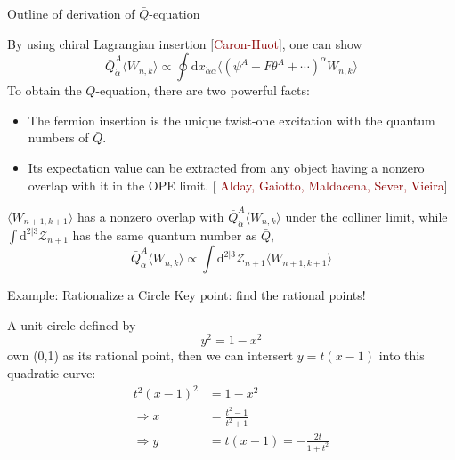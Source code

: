 \documentclass[10pt]{beamer}
\newcommand{\dif}{\mathrm{d}}
\begin{document}
\begin{frame}{Outline of derivation of $\bar{Q}$-equation} 

By using chiral Lagrangian insertion {\footnotesize[\textcolor{darkred}{Caron-Huot}]}, one can show  
\begin{equation*}
  \bar{Q}_{\dot{\alpha}}^{A}\langle W_{n,k}\rangle \propto \oint \dif x_{\dot{\alpha}\alpha} 
  \langle (\psi^{A}+F\theta^{A}+\cdots)^{\alpha} W_{n,k}\rangle
\end{equation*}
To obtain the $\bar{Q}$-equation, there are two powerful facts:
\begin{itemize}
  \item The fermion insertion is the unique twist-one excitation with the quantum numbers of $\bar{Q}$.
  \item Its expectation value can be extracted from any object having a nonzero overlap with it in the OPE limit. {\footnotesize[\textcolor{darkred}{ Alday, Gaiotto, Maldacena, Sever, Vieira}]}
\end{itemize}
$\langle W_{n+1,k+1}\rangle$ has a nonzero overlap with $\bar{Q}_{\dot{\alpha}}^{A}\langle W_{n,k}\rangle$ under the colliner limit, while $\int \dif^{2\vert 3} \mathcal{Z}_{n+1}$ has the same quantum number as $\bar{Q}$, 
\begin{equation*}
  \bar{Q}_{\dot{\alpha}}^{A}\langle W_{n,k}\rangle \propto \int \dif^{2\vert 3} \mathcal{Z}_{n+1} \langle W_{n+1,k+1}\rangle 
\end{equation*}

\end{frame} 

\iffalse
\begin{frame}[fragile]{Example: Rationalize a Circle}
  Key point: find the rational points!


  A unit circle defined by 
  \[
   y^{2}=1-x^{2}  
  \]
  own (0,1) as its rational point, then we can intersert $y=t(x-1)$ into this quadratic curve:
  \begin{align*}
    t^{2}(x-1)^{2} &=1-x^{2} \\
                 \Rightarrow x &= \frac{t^{2}-1}{t^{2}+1} \\
                 \Rightarrow y&=t(x-1)= -\frac{2t}{1+t^{2}}
  \end{align*}
\end{frame}
\end{document}
